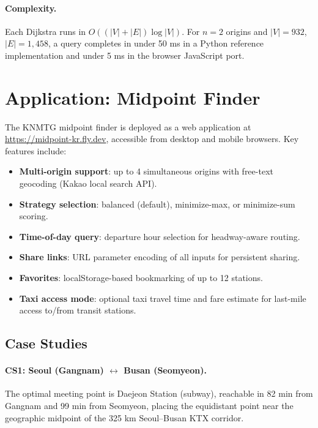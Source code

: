 \documentclass[12pt]{article}
\begin{document}
\paragraph{Complexity.}
Each Dijkstra runs in $O((|V|+|E|) \log |V|)$. For $n=2$ origins and
$|V|=932$, $|E|=1{,}458$, a query completes in under 50 ms in a Python
reference implementation and under 5 ms in the browser JavaScript port.

\section{Application: Midpoint Finder}

The KNMTG midpoint finder is deployed as a web application at
\url{https://midpoint-kr.fly.dev}, accessible from desktop and mobile
browsers. Key
features include:

\begin{itemize}
  \item \textbf{Multi-origin support}: up to 4 simultaneous origins
    with free-text geocoding (Kakao local search API).
  \item \textbf{Strategy selection}: balanced (default), minimize-max,
    or minimize-sum scoring.
  \item \textbf{Time-of-day query}: departure hour selection for
    headway-aware routing.
  \item \textbf{Share links}: URL parameter encoding of all inputs for
    persistent sharing.
  \item \textbf{Favorites}: localStorage-based bookmarking of up to 12
    stations.
  \item \textbf{Taxi access mode}: optional taxi travel time and fare
    estimate for last-mile access to/from transit stations.
\end{itemize}

\subsection{Case Studies}

\paragraph{CS1: Seoul (Gangnam) $\leftrightarrow$ Busan (Seomyeon).}
The optimal meeting point is Daejeon Station (subway), reachable in
82 min from Gangnam and 99 min from Seomyeon, placing the equidistant
point near the geographic midpoint of the 325 km Seoul--Busan KTX
corridor.
\end{document}
